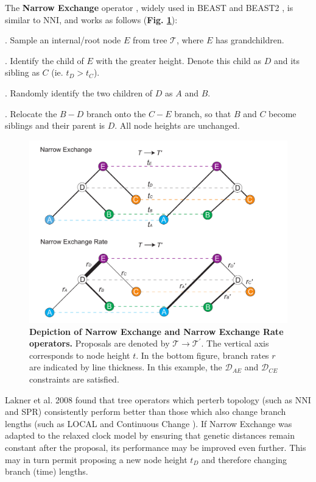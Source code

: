 \documentclass[10pt,letterpaper]{article}
\begin{document}
The \textbf{Narrow Exchange} operator \cite{drummond2002estimating}, widely used in BEAST \cite{drummond2012bayesian,suchard2018bayesian} and BEAST2 \cite{bouckaert2019beast}, is similar to NNI, and works as follows (\textbf{Fig. \ref{fig:narrowexchange}}):

. Sample an internal/root node $E$ from tree $\mathcal{T}$, where $E$ has grandchildren.

. Identify the child of $E$ with the greater height. Denote this child as $D$ and its sibling as $C$ (ie. $t_D > t_C$).

. Randomly identify the two children of $D$ as $A$ and $B$.

. Relocate the $B-D$ branch onto the $C-E$ branch, so that $B$ and $C$ become siblings and their parent is $D$. All node heights are unchanged.


\begin{figure}[!h]
\includegraphics[width=\textwidth]{Figures/NarrowExchange.pdf}
\caption{\textbf{Depiction of Narrow Exchange and Narrow Exchange Rate operators.} Proposals are denoted by $\mathcal{T} \rightarrow \mathcal{T}^\prime$. The vertical axis corresponds to node height $t$. In the bottom figure, branch rates $r$ are indicated by line thickness. In this example, the $\mathcal{D}_{AE}$ and $\mathcal{D}_{CE}$ constraints are satisfied.}
\label{fig:narrowexchange}
\end{figure}


Lakner et al. 2008 \cite{lakner2008efficiency} found that tree operators which perterb topology (such as NNI and SPR) consistently perform better than those which also change branch lengths (such as LOCAL \cite{simon1998local} and Continuous Change \cite{jow2002bayesian}). If Narrow Exchange was adapted to the relaxed clock model by ensuring that genetic distances remain constant after the proposal, its performance may be improved even further. This may in turn permit proposing a new node height $t_D$ and therefore changing branch (time) lengths.
\end{document}

